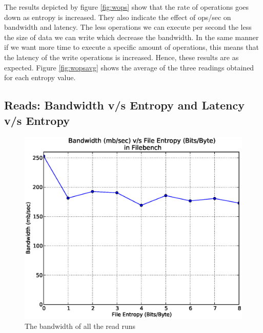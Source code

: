 \noindent The results depicted by figure \ref{fig:wops} show that the rate of operations goes down as entropy is increased. They also indicate the effect of ops/sec on bandwidth and latency. The less operations we can execute per second the less the size of data we can write which decrease the bandwidth. In the same manner if we want more time to execute a specific amount of operations, this means that the latency of the write operations is increased. Hence, these results are as expected. Figure \ref{fig:wopsavg} shows the average of the three readings obtained for each entropy value.

\subsection{Reads: Bandwidth v/s Entropy and Latency v/s Entropy}
\begin{figure}[H]
\begin{center}
\includegraphics[scale=0.55]{../results/set1/read_bw.eps}
\caption{The bandwidth of all the read runs }
\label{fig:rb}
\end{center}
\end{figure}

